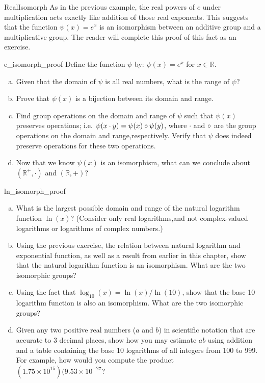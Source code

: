  
\begin{example}{RealIsomorph}
As in the previous example, the real powers of $e$ under multiplication acts exactly like addition of those real exponents.  
This suggests that the function $\psi(x)=e^x$ is an isomorphism between an additive group and a multiplicative group.  The reader will complete this proof of this fact as an exercise.  
\end{example}

\begin{exercise}{e_isomorph_proof}
Define the function $\psi$ by: $\psi(x) = e^x$ for $x \in \mathbb{R}$.
\begin{enumerate}[(a)]
\item
Given that the domain of $\psi$ is all real numbers, what is the range of $\psi$?
\item
Prove that $\psi(x)$ is a bijection between its domain and range.
\item
Find group operations on the domain and range of $\psi$ such that $\psi(x)$ preserves operations; i.e. $\psi(x \cdot y) = \psi(x)\circ \psi(y)$, where $\cdot$  and $\circ$ are the group operations on the domain and range,respectively. Verify that $\psi$ does indeed preserve operations for these two operations.
\item
Now that we know $\psi(x)$ is an isomorphism, what can we conclude about $({\mathbb R}^+,\cdot)$ and $({\mathbb R},+)$?
\end{enumerate}
\end{exercise}

\begin{exercise}{ln_isomorph_proof}
\begin{enumerate}[(a)]
\item
What is the largest possible domain and range of the natural logarithm function $\ln(x)$? (Consider only real logarithms,and not complex-valued logarithms or logarithms of complex numbers.)
\item
Using the previous exercise, the relation between natural logarithm and exponential function, as well as a result from earlier in this chapter, show that the natural logarithm function is an isomorphism. What are the two isomorphic groups?
\item
Using the fact that $\log_{10}(x) = \ln(x) / \ln(10)$, show that the base 10 logarithm function is also an isomorphism.  What are the two isomorphic groups?
\item 
Given any two positive real numbers ($a$ and $b$)  in scientific notation that are accurate to 3 decimal places, show how you may estimate $ab$ using addition and a table containing the base 10 logarithms of all integers from 100 to 999.  For example, how would you compute the product $(1.75 \times 10^{15})(9.53 \times 10^{-27}$?
\end{enumerate}
\end{exercise}

